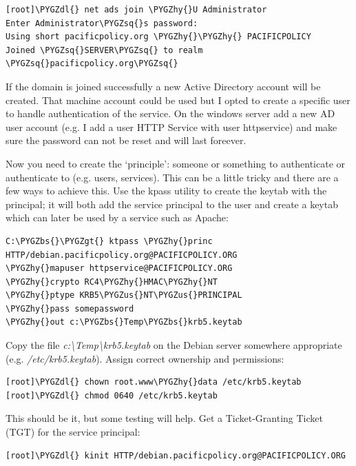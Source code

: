 \documentclass[letterpaper,10pt,english]{sphinxmanual}
\def\PYGZbs{\char`\\}
\def\PYGZus{\char`\_}
\def\PYGZgt{\char`\>}
\def\PYGZdl{\char`\$}
\def\PYGZhy{\char`\-}
\def\PYGZsq{\char`\'}
\begin{document}
\begin{Verbatim}[commandchars=\\\{\}]
[root]\PYGZdl{} net ads join \PYGZhy{}U Administrator
Enter Administrator\PYGZsq{}s password:
Using short pacificpolicy.org \PYGZhy{}\PYGZhy{} PACIFICPOLICY
Joined \PYGZsq{}SERVER\PYGZsq{} to realm \PYGZsq{}pacificpolicy.org\PYGZsq{}
\end{Verbatim}

If the domain is joined successfully a new Active Directory account
will be created. That machine account could be used but I opted to
create a specific user to handle authentication of the service. On the
windows server add a new AD user account (e.g. I add a user HTTP
Service with user httpservice) and make sure the password can not be
reset and will last foreever.

Now you need to create the `principle': someone or something to
authenticate or authenticate to (e.g. users, services). This can be a
little tricky and there are a few ways to achieve this. Use the kpass
utility to create the keytab with the principal; it will both add the
service principal to the user and create a keytab which can later be
used by a service such as Apache:

\begin{Verbatim}[commandchars=\\\{\}]
C:\PYGZbs{}\PYGZgt{} ktpass \PYGZhy{}princ HTTP/debian.pacificpolicy.org@PACIFICPOLICY.ORG
\PYGZhy{}mapuser httpservice@PACIFICPOLICY.ORG
\PYGZhy{}crypto RC4\PYGZhy{}HMAC\PYGZhy{}NT
\PYGZhy{}ptype KRB5\PYGZus{}NT\PYGZus{}PRINCIPAL
\PYGZhy{}pass somepassword
\PYGZhy{}out c:\PYGZbs{}Temp\PYGZbs{}krb5.keytab
\end{Verbatim}

Copy the file \emph{c:\textbackslash{}Temp\textbackslash{}krb5.keytab} on the Debian server somewhere
appropriate (e.g. \emph{/etc/krb5.keytab}). Assign correct ownership and
permissions:

\begin{Verbatim}[commandchars=\\\{\}]
[root]\PYGZdl{} chown root.www\PYGZhy{}data /etc/krb5.keytab
[root]\PYGZdl{} chmod 0640 /etc/krb5.keytab
\end{Verbatim}

This should be it, but some testing will help. Get a Ticket-Granting
Ticket (TGT) for the service principal:

\begin{Verbatim}[commandchars=\\\{\}]
[root]\PYGZdl{} kinit HTTP/debian.pacificpolicy.org@PACIFICPOLICY.ORG
\end{Verbatim}
\end{document}
